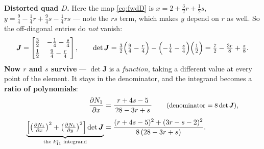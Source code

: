 \documentclass[11pt]{article}
\begin{document}
\begin{steps}
\item \textbf{Distorted quad $D$.} Here the map \eqref{eq:fwdD} is
      $x=2+\tfrac32r+\tfrac12s$, $y=\tfrac94-\tfrac14r+\tfrac94s-\tfrac14rs$ ---
      note the $rs$ term, which makes $y$ depend on $r$ as well. So the
      off-diagonal entries do \emph{not} vanish:
      \[
        \bm{J}=\begin{bmatrix}
          \tfrac32 & -\tfrac14-\tfrac{s}{4}\\[3pt]
          \tfrac12 & \tfrac94-\tfrac{r}{4}
        \end{bmatrix},
        \qquad
        \det\bm{J}=\tfrac32\Bigl(\tfrac94-\tfrac{r}{4}\Bigr)-\Bigl(-\tfrac14-\tfrac{s}{4}\Bigr)\Bigl(\tfrac12\Bigr)
        =\tfrac72-\tfrac{3r}{8}+\tfrac{s}{8}.
      \]
      \textbf{Now $r$ and $s$ survive} --- $\det\bm{J}$ is a \emph{function},
      taking a different value at every point of the element. It stays in the
      denominator, and the integrand becomes a \textbf{ratio of polynomials}:
\begin{align}
  \frac{\partial N_{1}}{\partial x}
    &=\frac{r+4s-5}{\,28-3r+s\,}
    \qquad\text{\small(denominator $=8\det\bm{J}$)},\notag\\[4pt]
  \underbrace{\Bigl[\bigl(\tfrac{\partial N_{1}}{\partial x}\bigr)^{2}
             +\bigl(\tfrac{\partial N_{1}}{\partial y}\bigr)^{2}\Bigr]\det\bm{J}}
             _{\text{the } k^{e}_{11}\text{ integrand}}
    &=\frac{(r+4s-5)^{2}+(3r-s-2)^{2}}{8\,(28-3r+s)} .\label{eq:rational}
\end{align}
\end{steps}
\end{document}
